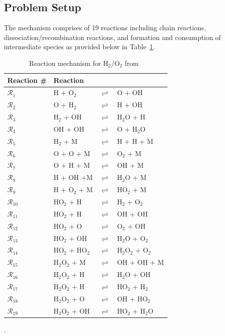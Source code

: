 \subsection{Problem Setup}
\label{sub:setup}  
The mechanism comprises of 19 reactions including chain reactions,
dissociation/recombination reactions, and formation and consumption
of intermediate species as provided below in Table~\ref{tab:kinetics}.
%
\begin{table}[htbp]
\renewcommand*{\arraystretch}{1.2}
\begin{center}
\begin{tabular}{llll}
\toprule
Reaction \#     & Reaction &&\\
\bottomrule
$\mathcal{R}_1$ & H + O$_2$          & $\rightleftharpoons$ & O + OH \\
$\mathcal{R}_2$ & O + H$_2$          & $\rightleftharpoons$ & H + OH \\
$\mathcal{R}_3$ & H$_2$ + OH         & $\rightleftharpoons$ & H$_2$O + H \\
$\mathcal{R}_4$ & OH + OH            & $\rightleftharpoons$ & O + H$_2$O \\
$\mathcal{R}_5$ & H$_2$ + M          & $\rightleftharpoons$ & H + H + M \\
$\mathcal{R}_6$ & O + O + M          & $\rightleftharpoons$ & O$_2$ + M \\
$\mathcal{R}_7$ & O + H + M          & $\rightleftharpoons$ & OH + M \\
$\mathcal{R}_8$ & H + OH +M          & $\rightleftharpoons$ & H$_2$O + M \\
$\mathcal{R}_9$ & H + O$_2$ + M      & $\rightleftharpoons$ & HO$_2$ + M \\
$\mathcal{R}_{10}$ & HO$_2$ + H      & $\rightleftharpoons$ & H$_2$ + O$_2$ \\
$\mathcal{R}_{11}$ & HO$_2$ + H      & $\rightleftharpoons$ & OH + OH \\
$\mathcal{R}_{12}$ & HO$_2$ + O      & $\rightleftharpoons$ & O$_2$ + OH \\
$\mathcal{R}_{13}$ & HO$_2$ + OH     & $\rightleftharpoons$ & H$_2$O + O$_2$ \\
$\mathcal{R}_{14}$ & HO$_2$ + HO$_2$ & $\rightleftharpoons$ & H$_2$O$_2$ + O$_2$ \\
$\mathcal{R}_{15}$ & H$_2$O$_2$ + M  & $\rightleftharpoons$ & OH + OH + M \\
$\mathcal{R}_{16}$ & H$_2$O$_2$ + H  & $\rightleftharpoons$ & H$_2$O + OH \\
$\mathcal{R}_{17}$ & H$_2$O$_2$ + H  & $\rightleftharpoons$ & HO$_2$ + H$_2$ \\
$\mathcal{R}_{18}$ & H$_2$O$_2$ + O  & $\rightleftharpoons$ & OH + HO$_2$ \\
$\mathcal{R}_{19}$ & H$_2$O$_2$ + OH & $\rightleftharpoons$ & HO$_2$ + H$_2$O \\
\bottomrule
\end{tabular}
\end{center}
\caption{Reaction mechanism for H$_2$/O$_2$ from~\cite{Yetter:1991}}.
\label{tab:kinetics}
\end{table}
